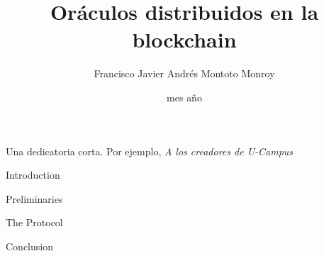 \documentclass[upright, contnum]{umemoria}
\author{Francisco Javier Andr\'es Montoto Monroy}
\title{Or\'aculos distribuidos en la blockchain}
\date{mes {a\~no}}
\begin{document}
\frontmatter
\maketitle

\begin{abstract}
	
\end{abstract}

\begin{dedicatoria} %
	Una dedicatoria corta. Por ejemplo, \emph{A los creadores de U-Campus}
\end{dedicatoria}

\begin{thanks} %
	\lipsum[1-2]
\end{thanks}
\cleardoublepage
{}
\tableofcontents
\listoftables %
\listoffigures %

\mainmatter

\begin{my_section}{Introduction}
	
\end{my_section}

\begin{my_section}{Preliminaries}
	
	
	
	
	
\end{my_section}

\begin{my_section}{The Protocol}
	
	
	
	
	
	
\end{my_section}

\begin{my_section}{Conclusion}
	
\end{my_section}

\printbibliography
\end{document}

